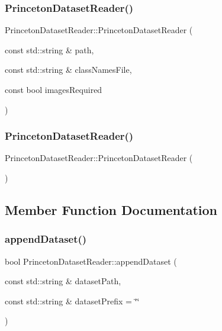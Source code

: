 \subsubsection{\texorpdfstring{Princeton\+Dataset\+Reader()}{PrincetonDatasetReader()}\hspace{0.1cm}{\footnotesize\ttfamily [1/2]}}
{\footnotesize\ttfamily Princeton\+Dataset\+Reader\+::\+Princeton\+Dataset\+Reader (\begin{DoxyParamCaption}\item[{const std\+::string \&}]{path,  }\item[{const std\+::string \&}]{class\+Names\+File,  }\item[{const bool}]{images\+Required }\end{DoxyParamCaption})}

\mbox{\label{class_princeton_dataset_reader_a2402d825ffb72fddd54c0576bc5e2866}} 
\subsubsection{\texorpdfstring{Princeton\+Dataset\+Reader()}{PrincetonDatasetReader()}\hspace{0.1cm}{\footnotesize\ttfamily [2/2]}}
{\footnotesize\ttfamily Princeton\+Dataset\+Reader\+::\+Princeton\+Dataset\+Reader (\begin{DoxyParamCaption}{ }\end{DoxyParamCaption})\hspace{0.3cm}{\ttfamily [default]}}



\subsection{Member Function Documentation}
\mbox{\label{class_princeton_dataset_reader_a078bdc2105cbef10ce0dc8c2fd12923e}} 
\subsubsection{\texorpdfstring{append\+Dataset()}{appendDataset()}}
{\footnotesize\ttfamily bool Princeton\+Dataset\+Reader\+::append\+Dataset (\begin{DoxyParamCaption}\item[{const std\+::string \&}]{dataset\+Path,  }\item[{const std\+::string \&}]{dataset\+Prefix = {\ttfamily \char`\"{}\char`\"{}} }\end{DoxyParamCaption})\hspace{0.3cm}{\ttfamily [virtual]}}



